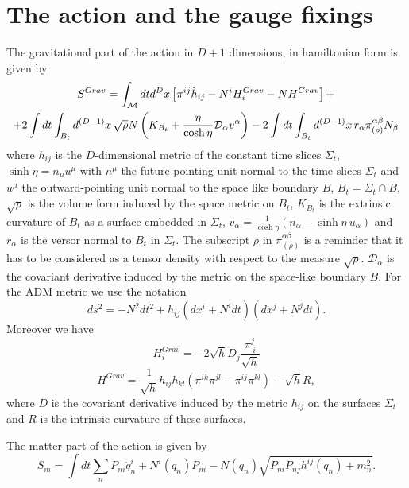 \documentclass[a4paper,12pt]{article}
\begin{document}
\section{The action and the gauge fixings}
The gravitational part of the  action in $D+1$ dimensions, in hamiltonian
form is given by \cite{hawkinghunter,hayward}
\begin{multline}\label{azione}
S^{Grav} = \int_{{\cal M}} dt d^Dx \left[ \pi^{ij}\dot h_{ij} -
N^i H_i^{Grav} - NH^{Grav}\right]+ \\ 
+2\int dt \int_{B_t} d^{(D-1)}x
\,\sqrt{\rho} N \left( K_{B_t}+\frac{\eta}{\cosh\eta}
\mathcal{D}_\alpha
v^\alpha\right) -2\int dt \int_{B_t} d^{(D-1)}x\, r_\alpha
\pi^{\alpha\beta}_{(\rho)} N_\beta 
\end{multline} 
where $h_{ij}$ is the $D$-dimensional metric of the constant time
slices $\Sigma_t$, $\sinh \eta=n_\mu u^\mu$ with $n^\mu$ the
future-pointing unit normal to the time slices $\Sigma_t$ and $u^\mu$
the outward-pointing unit normal to the space like boundary $B$,
$B_t= \Sigma_t\cap B$,
$\sqrt{\rho}$ is the volume form induced by the space metric on $B_t$,
$K_{B_t}$ is the extrinsic curvature of $B_t$ as a surface embedded in 
$\Sigma_t$, $v_\alpha=\frac{1}{\cosh \eta}(n_\alpha-\sinh \eta ~u_\alpha)$
and $r_\alpha$ is the versor normal to $B_t$ in $\Sigma_t$.
The subscript $\rho$ in $\pi^{\alpha\beta}_{(\rho)}$
is a reminder that it has to be considered as a tensor density with respect
to the measure $\sqrt{\rho}$. $\mathcal{D}_\alpha$ is the covariant 
derivative induced by the metric on the space-like boundary $B$.
For the ADM metric \cite{ADM} we use the notation
\begin{equation}
ds^2 = -N^2 dt^2 +h_{ij}(dx^i+N^i dt)(dx^j+N^j dt).
\end{equation}
Moreover we have
\begin{equation}
H^{Grav}_i = -2 \sqrt h D_j\frac{\pi^j_{~i}}{\sqrt{h}}
\end{equation}
\begin{equation}
H^{Grav} = \frac{1}{\sqrt{h}} h_{ij}h_{kl} (\pi^{ik}\pi^{jl}-\pi^{ij}\pi^{kl})
-\sqrt{h}R,
\end{equation}
where $D$ is the covariant derivative induced by the
metric $h_{ij}$ on the surfaces $\Sigma_t$ and $R$ is the intrinsic
curvature of these surfaces.

The matter part of the action is given by
\begin{equation}\label{azionemateria}
S_m = \int
dt \sum_n P_{ni}\dot q^i_n+N^i(q_n)P_{ni}-N(q_n)
\sqrt{P_{ni} P_{nj} h^{ij}(q_n)+ m_n^2} .
\end{equation} 
\end{document}

